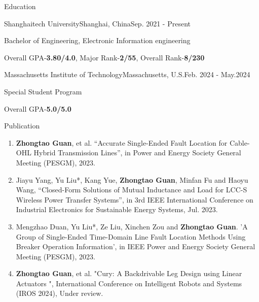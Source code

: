 \documentclass[]{ZhongtaoGuan-resume}
\begin{document}
\resumeheader
{}
{}
{}
{}
{}

\begin{section}{Education}
 \begin{subsectionnobullet}{Shanghaitech University}{Shanghai, China}{Sep. 2021 - Present}{}
     \item{Bachelor of Engineering, Electronic Information engineering}
     \item{Overall GPA-\textbf{3.80/4.0}, Major Rank-\textbf{2/55}, Overall Rank-\textbf{8/230}}
 \end{subsectionnobullet}
 
 \begin{subsectionnobullet}{Massachusetts Institute of Technology}{Massachusetts, U.S.}{Feb. 2024 - May.2024}{}
     \item {Special Student Program}
     \item {Overall GPA-\textbf{5.0/5.0}}
 \end{subsectionnobullet}
\end{section}


\begin{section}{Publication}
 \begin{enumerate}
     \item \textbf{Zhongtao Guan}, et al. “Accurate Single-Ended Fault Location for Cable-OHL Hybrid Transmission Lines”, in Power and Energy Society General Meeting (PESGM), 2023. %
     \item Jiayu Yang, Yu Liu*, Kang Yue, \textbf{Zhongtao Guan}, Minfan Fu and Haoyu Wang, “Closed-Form Solutions of Mutual Inductance and Load for LCC-S Wireless Power Transfer Systems”, in 3rd IEEE International Conference on Industrial Electronics for Sustainable Energy Systems, Jul. 2023.
     \item Mengzhao Duan, Yu Liu*, Ze Liu, Xinchen Zou and \textbf{Zhongtao Guan}. 'A Group of Single-Ended Time-Domain Line Fault Location Methods Using Breaker Operation Information', in IEEE Power and Energy Society General Meeting (PESGM), 2023.%
     \item \textbf{Zhongtao Guan}, et al. "Cury: A Backdrivable Leg Design using Linear Actuators ", International Conference on Intelligent Robots and Systems (IROS 2024), Under review.
 \end{enumerate}
\end{section}
\end{document}
